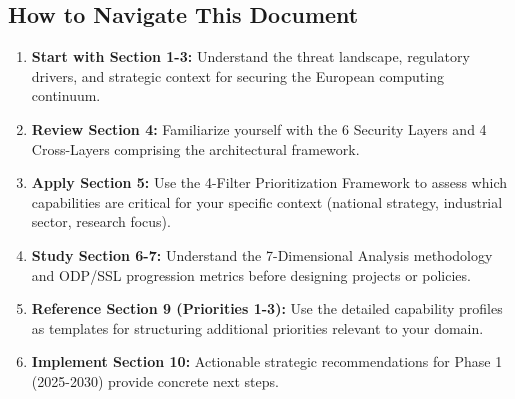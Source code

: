 \subsection*{How to Navigate This Document}
\begin{enumerate}
    \item \textbf{Start with Section 1-3:} Understand the threat landscape, regulatory drivers, and strategic context for securing the European computing continuum.
    
    \item \textbf{Review Section 4:} Familiarize yourself with the 6 Security Layers and 4 Cross-Layers comprising the architectural framework.
    
    \item \textbf{Apply Section 5:} Use the 4-Filter Prioritization Framework to assess which capabilities are critical for your specific context (national strategy, industrial sector, research focus).
    
    \item \textbf{Study Section 6-7:} Understand the 7-Dimensional Analysis methodology and ODP/SSL progression metrics before designing projects or policies.
    
    \item \textbf{Reference Section 9 (Priorities 1-3):} Use the detailed capability profiles as templates for structuring additional priorities relevant to your domain.
    
    \item \textbf{Implement Section 10:} Actionable strategic recommendations for Phase 1 (2025-2030) provide concrete next steps.
\end{enumerate}

